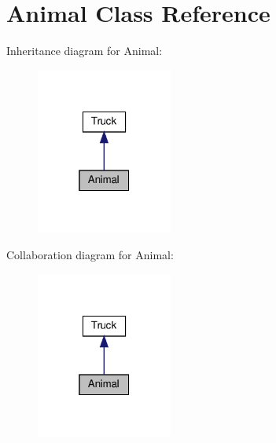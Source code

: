 \hypertarget{class_animal}{}\section{Animal Class Reference}
\label{class_animal}


Inheritance diagram for Animal\+:\nopagebreak
\begin{figure}[H]
\begin{center}
\leavevmode
\includegraphics[width=127pt]{class_animal__inherit__graph}
\end{center}
\end{figure}


Collaboration diagram for Animal\+:\nopagebreak
\begin{figure}[H]
\begin{center}
\leavevmode
\includegraphics[width=127pt]{class_animal__coll__graph}
\end{center}
\end{figure}

